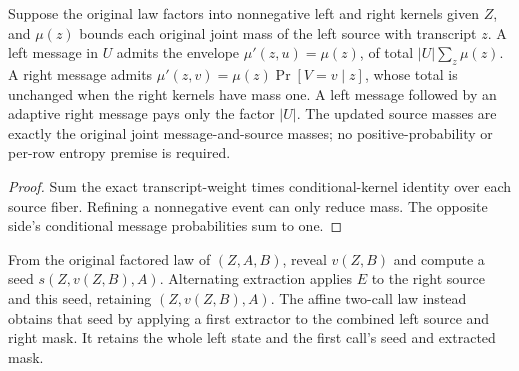 \begin{theorem}
  \label{thm:lowerbounds-algebraic-transcript-envelopes}
  \leanok
  Suppose the original law factors into nonnegative left and right kernels
  given $Z$, and $\mu(z)$ bounds each original joint mass of the left source
  with transcript $z$. A left message in $U$ admits the envelope
  $\mu'(z,u)=\mu(z)$, of total $|U|\sum_z\mu(z)$. A right message
  admits $\mu'(z,v)=\mu(z)\Pr[V=v\mid z]$, whose total is unchanged
  when the right kernels have mass one. A left message followed by an
  adaptive right message pays only the factor $|U|$. The updated source
  masses are exactly the original joint message-and-source masses;
  no positive-probability or per-row entropy premise is required.
\end{theorem}
\begin{proof}
  \leanok
  Sum the exact transcript-weight times conditional-kernel identity over
  each source fiber. Refining a nonnegative event can only reduce mass.
  The opposite side's conditional message probabilities sum to one.
\end{proof}

\begin{definition}
  \label{def:lowerbounds-algebraic-alternating-laws}
  \leanok
  From the original factored law of $(Z,A,B)$, reveal $v(Z,B)$ and
  compute a seed $s(Z,v(Z,B),A)$. Alternating extraction applies $E$
  to the right source and this seed, retaining $(Z,v(Z,B),A)$.
  The affine two-call law instead obtains that seed by applying a first
  extractor to the combined left source and right mask. It retains the
  whole left state and the first call's seed and extracted mask.
\end{definition}

